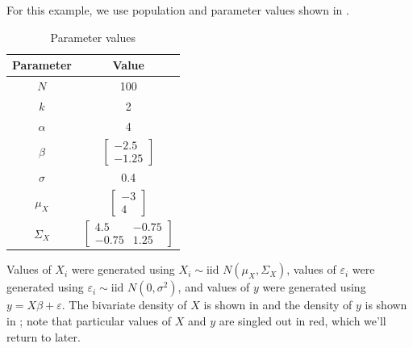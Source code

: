 \documentclass{article}
\newcommand{\ep}{\varepsilon}
\begin{document}
For this example, we use population and parameter values shown in .
\begin{table}
\centering
\begin{tabular}{|c|c|}
	\hline
	\textbf{Parameter} & \textbf{Value} \\ \hline
	$N$ & 100 \\ \hline
	$k$ & 2 \\ \hline
	$\alpha$ & 4 \\ \hline
	$\beta$ & $\begin{bmatrix} -2.5 \\ -1.25 \end{bmatrix}$ \\ \hline
	$\sigma$ & 0.4 \\ \hline
	$\mu_X$ & $\begin{bmatrix} -3 \\ 4\end{bmatrix}$ \\ \hline
	$\Sigma_X$ & $\begin{bmatrix} 4.5 & -0.75 \\ -0.75 & 1.25 \end{bmatrix}$ \\ \hline
\end{tabular}
\caption{Parameter values}
\label{tab:lm-normal-params}
\end{table}
Values of $X_i$ were generated using $X_i \sim \mbox{iid } N(\mu_X, \Sigma_X)$, values of $\ep_i$ were generated using $\ep_i \sim \mbox{iid } N(0, \sigma^2)$, and values of $y$ were generated using $y = X\beta + \ep$. The bivariate density of $X$ is shown in  and the density of $y$ is shown in ; note that particular values of $X$ and $y$ are singled out in red, which we'll return to later.
\end{document}
